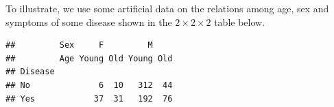 \documentclass[11pt]{book}
\renewenvironment{knitrout}{\small\renewcommand{\baselinestretch}{.85}}{} %
\begin{document}
To illustrate, we use some artificial data on the relations among
age, sex and symptoms of some disease shown in the $2 \times 2 \times 2$ table
 below.
\begin{knitrout}
\color{fgcolor}\begin{kframe}
\begin{alltt}
 \hlkwb{<-} \hlstd{(}\hlstd{(}\hlstd{,} \hlstd{,} \hlstd{,} \hlstd{,}
                 \hlstd{,} \hlstd{,} \hlstd{,} \hlstd{),}
  \hlstd{=} \hlstd{(}\hlstd{,}\hlstd{,}\hlstd{),}
  \hlstd{=} \hlstd{(}\hlstd{=}\hlstd{(}\hlstd{,} \hlstd{),}
                 \hlstd{=}\hlstd{(}\hlstd{,} \hlstd{),}
                 \hlstd{=}\hlstd{(}\hlstd{,} \hlstd{))}
 \hlstd{)}
 \hlkwb{<-} 
\hlopt{+} \hlopt{~} 
\end{alltt}
\begin{verbatim}
##         Sex     F         M    
##         Age Young Old Young Old
## Disease                        
## No              6  10   312  44
## Yes            37  31   192  76
\end{verbatim}
\end{kframe}
\end{knitrout}
\end{document}
